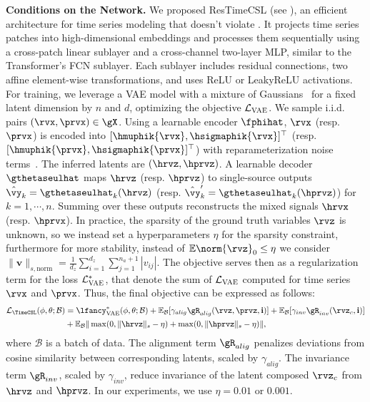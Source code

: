 \documentclass{article} %
\theoremstyle{plain}
\theoremstyle{definition}
\theoremstyle{remark}
\numberwithin{equation}{section}
\begin{document}
\textbf{Conditions on the Network.} We proposed ResTimeCSL (see ), an efficient architecture for time series modeling that doesn't violate . It projects time series patches into high-dimensional embeddings and processes them sequentially using a cross-patch linear sublayer and a cross-channel two-layer MLP, similar to the Transformer’s FCN sublayer. Each sublayer includes residual connections, two affine element-wise transformations, and uses ReLU or LeakyReLU activations. For training, we leverage a VAE model with a mixture of Gaussians~\citep{jiang2016variational} for a fixed latent dimension by $n$ and $d$, optimizing the objective $\mathcal{L}_{\textsc{VAE}}$. We sample i.i.d. pairs \((\rvx, \prvx) \in \gX\). Using a learnable encoder \(\fphihat\), \(\rvx\) (resp. \(\prvx\)) is encoded into \([\hmuphik{\rvx}, \hsigmaphik{\rvx}]^{\top}\) (resp. \([\hmuphik{\prvx},  \hsigmaphik{\prvx}]^{\top}\)) with reparameterization noise terms~\citep{kingma_auto-encoding_2022-1}. The inferred latents are \((\hrvz, \hprvz)\). A learnable decoder \(\gthetaseulhat\) maps \(\hrvz\) (resp. \(\hprvz\)) to single-source outputs \(\hat{\vy}_k = \gthetaseulhat_{k}(\hrvz)\) (resp. \(\hat{\vy}^{\prime}_k = \gthetaseulhat_{k}(\hprvz)\)) for \(k = 1, \cdots, n\). Summing over these outputs reconstructs the mixed signals \(\hrvx\) (resp. \(\hprvx\)). In practice, the sparsity of the ground truth variables $\rvz$ is unknown, so we instead set a hyperparameters $\eta$ for the sparsity constraint, furthermore for more stability, instead of $\mathbb{E}\norm{\rvz}_{0} \leq \eta$ we consider $\| \mathbf{v} \|_{s,\text{norm}} = \frac{1}{d_{z}} \sum_{i=1}^{d_{z}} \sum_{j=1}^{n_a + 1} |v_{ij}|$. The \TimeCSL objective serves then as a regularization term for the loss $\mathcal{L}^{*}_{\textsc{VAE}}$, that denote the sum of $\mathcal{L}_{\textsc{VAE}}$ computed for time series $\rvx $ and $\prvx$. Thus, the final objective can be expressed as follows: 
\begin{align}\label{equ:TimeCSL}
\mathcal{L}_{\TimeCSL}(\phi, \theta; \mathcal{B}) &= \lfancy^{*}_\text{VAE}(\phi,\theta; \mathcal{B}) + \mathbb{E}_{\mathcal{B}}[\gamma_{alig}\gR_{alig}(\rvz, \prvz, \mathbf{i})] + \mathbb{E}_{\mathcal{B}} [\gamma_{inv}\gR_{inv}(\rvz_{c}, \mathbf{i})] \\
&+ \mathbb{E}_{\mathcal{B}}\|\max(0, \|\hrvz\|_s - \eta) + \max(0, \|\hprvz\|_s - \eta)\|\nonumber,
\end{align}
where $\mathcal{B}$ is a batch of data. The alignment term $\gR_{alig}$ penalizes deviations from cosine similarity between corresponding latents, scaled by $\gamma_{alig}$. The invariance term $\gR_{inv}$, scaled by $\gamma_{inv}$, reduce invariance of the latent composed $\rvz_{c}$ from $\hrvz$ and $\hprvz$. In our experiments, we use $\eta=0.01$ or $0.001$.   %
\end{document}
